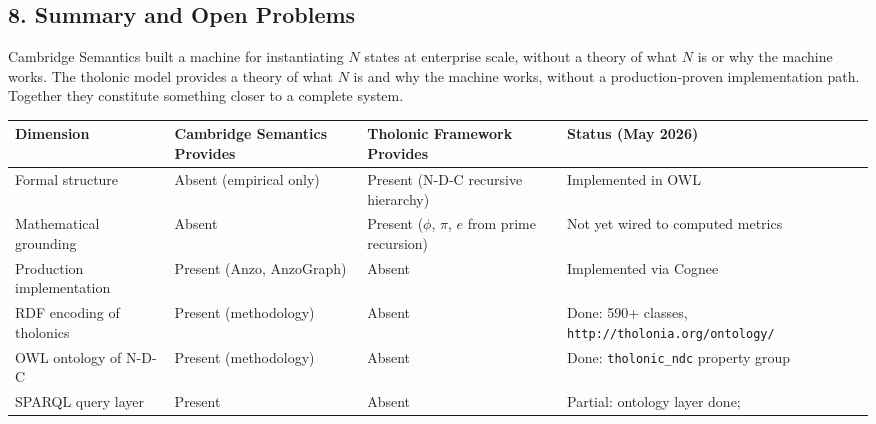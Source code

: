 \documentclass[
  11pt,
  letterpaper,
]{article}
\begin{document}
\subsection{8. Summary and Open
Problems}\label{summary-and-open-problems}

Cambridge Semantics built a machine for instantiating \(N\) states at
enterprise scale, without a theory of what \(N\) is or why the machine
works. The tholonic model provides a theory of what \(N\) is and why the
machine works, without a production-proven implementation path. Together
they constitute something closer to a complete system.

\begin{longtable}[]{@{}
  >{\raggedright\arraybackslash}p{}
  >{\raggedright\arraybackslash}p{}
  >{\raggedright\arraybackslash}p{}
  >{\raggedright\arraybackslash}p{}@{}}
\toprule\noalign{}
\begin{minipage}[b]{\linewidth}\raggedright
Dimension
\end{minipage} & \begin{minipage}[b]{\linewidth}\raggedright
Cambridge Semantics Provides
\end{minipage} & \begin{minipage}[b]{\linewidth}\raggedright
Tholonic Framework Provides
\end{minipage} & \begin{minipage}[b]{\linewidth}\raggedright
Status (May 2026)
\end{minipage} \\
\midrule\noalign{}
\endhead
\bottomrule\noalign{}
\endlastfoot
Formal structure & Absent (empirical only) & Present (N-D-C recursive
hierarchy) & Implemented in OWL \\
Mathematical grounding & Absent & Present (\(\phi\), \(\pi\), \(e\) from
prime recursion) & Not yet wired to computed metrics \\
Production implementation & Present (Anzo, AnzoGraph) & Absent &
Implemented via Cognee \\
RDF encoding of tholonics & Present (methodology) & Absent & Done: 590+
classes, \texttt{http://tholonia.org/ontology/} \\
OWL ontology of N-D-C & Present (methodology) & Absent & Done:
\texttt{tholonic\_ndc} property group \\
SPARQL query layer & Present & Absent & Partial: ontology layer done;

\end{longtable}
\end{document}
